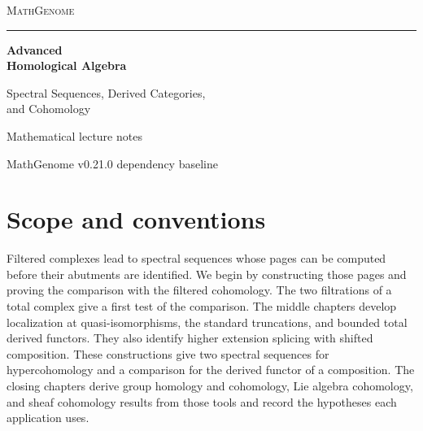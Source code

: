 \documentclass[11pt,oneside,openany]{book}
\theoremstyle{definition}
\theoremstyle{remark}
\begin{document}
\frontmatter
\hypersetup{pageanchor=false}
\begin{titlepage}
\thispagestyle{empty}
\begin{flushleft}
\vspace*{0.65in}
{\large\scshape\color{deepgreen}MathGenome\par}
\vspace{0.35in}
{\color{rulegreen}\rule{0.94\textwidth}{0.65pt}\par}
\vspace{0.43in}
{\color{ink}\fontsize{36}{42}\selectfont\bfseries
Advanced\\[4pt] Homological Algebra\par}
\vspace{0.32in}
{\color{deepgreen}\Large Spectral Sequences, Derived Categories,\\[3pt] and Cohomology\par}
\vfill
{\large Mathematical lecture notes\par}
\vspace{0.10in}
{\normalsize MathGenome v0.21.0 dependency baseline\par}
\vspace*{0.45in}
\end{flushleft}
\end{titlepage}
\hypersetup{pageanchor=true}

\begingroup
\small
\tableofcontents
\endgroup

\chapter*{Scope and conventions}

Filtered complexes lead to spectral sequences whose pages can be computed
before their abutments are identified. We begin by constructing those pages
and proving the comparison with the filtered cohomology. The two filtrations
of a total complex give a first test of the comparison. The middle chapters
develop localization at quasi-isomorphisms, the standard truncations, and
bounded total derived functors. They also identify higher extension
splicing with shifted composition. These constructions give two spectral
sequences for hypercohomology and a comparison for the derived functor of a
composition. The closing chapters derive group homology and cohomology,
Lie algebra cohomology, and sheaf cohomology results from those tools and
record the hypotheses each application uses.
\end{document}
